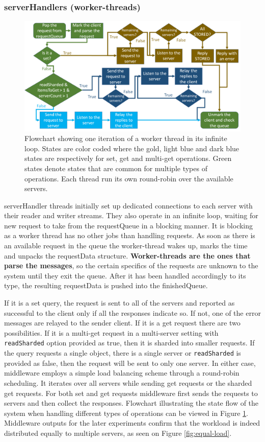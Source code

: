 \documentclass[11pt,a4paper]{article}
\begin{document}
\subsubsection{serverHandlers (worker-threads)} \label{sec:ov-workerthread}
\begin{figure}[h!]
  \centering
  \includegraphics[width=0.9\linewidth,trim={0px 0px 0px 0px},clip]{img/flowchart.png}
  \caption{Flowchart showing one iteration of a worker thread in its infinite loop. States are color coded where the gold, light blue and dark blue states are respectively for set, get and multi-get operations. Green states denote states that are common for multiple types of operations. Each thread run its own round-robin over the available servers.}
  \label{fig:flowchart}
\end{figure}
serverHandler threads initially set up dedicated connections to each server with their reader and writer streams. They also operate in an infinite loop, waiting for new request to take from the requestQueue in a blocking manner. It is blocking as a worker thread has no other jobs than handling requests. As soon as there is an available request in the queue the worker-thread wakes up, marks the time and unpacks the requestData structure. \textbf{Worker-threads are the ones that parse the messages}, so the certain specifics of the requests are unknown to the system until they exit the queue. After it has been handled accordingly to its type, the resulting requestData is pushed into the finishedQueue.
\par If it is a set query, the request is sent to all of the servers and reported as successful to the client only if all the responses indicate so. If not, one of the error messages are relayed to the sender client. If it is a get request there are two possibilities. If it is a multi-get request in a multi-server setting with \texttt{readSharded} option provided as true, then it is sharded into smaller requests. If the query requests a single object, there is a single server or \texttt{readSharded} is provided as false, then the request will be sent to only one server. In either case, middleware employs a simple load balancing scheme through a round-robin scheduling. It iterates over all servers while sending get requests or the sharded get requests. For both set and get requests middleware first sends the requests to servers and then collect the responses. Flowchart illustrating the state flow of the system when handling different types of operations can be viewed in Figure \ref{fig:flowchart}. Middleware outputs for the later experiments confirm that the workload is indeed distributed equally to multiple servers, as seen on Figure \ref{fig:equal-load}.
\end{document}
